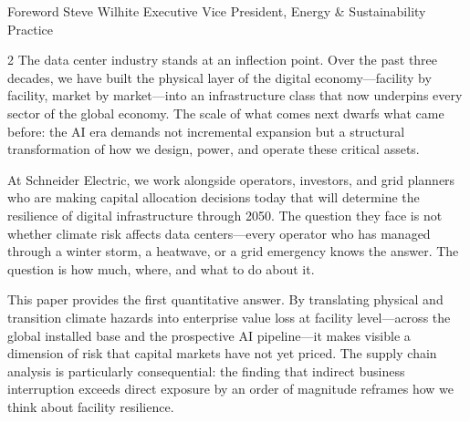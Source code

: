   {Foreword}
  {Steve Wilhite}
  {Executive Vice President, Energy \& Sustainability Practice}

\vspace{-3mm}
\vspace{6mm}

\begin{multicols}{2}\raggedcolumns
\color{SEDarkGreen}
\noindent The data center industry stands at an inflection point. Over the past three decades, we have built the physical layer of the digital economy---facility by facility, market by market---into an infrastructure class that now underpins every sector of the global economy. The scale of what comes next dwarfs what came before: the AI era demands not incremental expansion but a structural transformation of how we design, power, and operate these critical assets.

\vspace{4mm}

\noindent At Schneider Electric, we work alongside operators, investors, and grid planners who are making capital allocation decisions today that will determine the resilience of digital infrastructure through 2050. The question they face is not whether climate risk affects data centers---every operator who has managed through a winter storm, a heatwave, or a grid emergency knows the answer. The question is how much, where, and what to do about it.

\vspace{4mm}

\noindent This paper provides the first quantitative answer. By translating physical and transition climate hazards into enterprise value loss at facility level---across the global installed base and the prospective AI pipeline---it makes visible a dimension of risk that capital markets have not yet priced. The supply chain analysis is particularly consequential: the finding that indirect business interruption exceeds direct exposure by an order of magnitude reframes how we think about facility resilience.

\columnbreak


\end{multicols}
